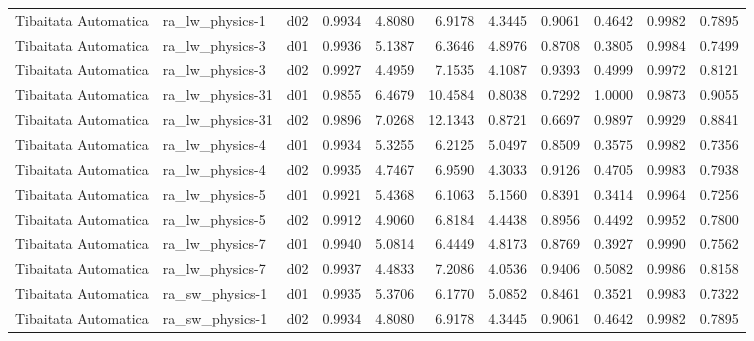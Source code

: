 \begin{longtable}{lllrrrrrrrr}
 Tibaitata Automatica  &       ra\_lw\_physics-1 &     d02 &   0.9934 &   4.8080 &   6.9178 &       4.3445 &        0.9061 &       0.4642 &           0.9982 &  0.7895 \\
 Tibaitata Automatica  &       ra\_lw\_physics-3 &     d01 &   0.9936 &   5.1387 &   6.3646 &       4.8976 &        0.8708 &       0.3805 &           0.9984 &  0.7499 \\
 Tibaitata Automatica  &       ra\_lw\_physics-3 &     d02 &   0.9927 &   4.4959 &   7.1535 &       4.1087 &        0.9393 &       0.4999 &           0.9972 &  0.8121 \\
 Tibaitata Automatica  &      ra\_lw\_physics-31 &     d01 &   0.9855 &   6.4679 &  10.4584 &       0.8038 &        0.7292 &       1.0000 &           0.9873 &  0.9055 \\
 Tibaitata Automatica  &      ra\_lw\_physics-31 &     d02 &   0.9896 &   7.0268 &  12.1343 &       0.8721 &        0.6697 &       0.9897 &           0.9929 &  0.8841 \\
 Tibaitata Automatica  &       ra\_lw\_physics-4 &     d01 &   0.9934 &   5.3255 &   6.2125 &       5.0497 &        0.8509 &       0.3575 &           0.9982 &  0.7356 \\
 Tibaitata Automatica  &       ra\_lw\_physics-4 &     d02 &   0.9935 &   4.7467 &   6.9590 &       4.3033 &        0.9126 &       0.4705 &           0.9983 &  0.7938 \\
 Tibaitata Automatica  &       ra\_lw\_physics-5 &     d01 &   0.9921 &   5.4368 &   6.1063 &       5.1560 &        0.8391 &       0.3414 &           0.9964 &  0.7256 \\
 Tibaitata Automatica  &       ra\_lw\_physics-5 &     d02 &   0.9912 &   4.9060 &   6.8184 &       4.4438 &        0.8956 &       0.4492 &           0.9952 &  0.7800 \\
 Tibaitata Automatica  &       ra\_lw\_physics-7 &     d01 &   0.9940 &   5.0814 &   6.4449 &       4.8173 &        0.8769 &       0.3927 &           0.9990 &  0.7562 \\
 Tibaitata Automatica  &       ra\_lw\_physics-7 &     d02 &   0.9937 &   4.4833 &   7.2086 &       4.0536 &        0.9406 &       0.5082 &           0.9986 &  0.8158 \\
 Tibaitata Automatica  &       ra\_sw\_physics-1 &     d01 &   0.9935 &   5.3706 &   6.1770 &       5.0852 &        0.8461 &       0.3521 &           0.9983 &  0.7322 \\
 Tibaitata Automatica  &       ra\_sw\_physics-1 &     d02 &   0.9934 &   4.8080 &   6.9178 &       4.3445 &        0.9061 &       0.4642 &           0.9982 &  0.7895 \\

\end{longtable}
